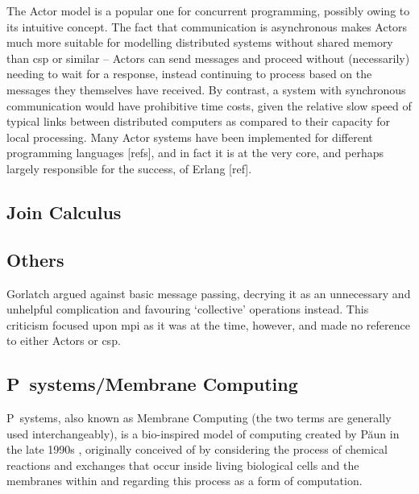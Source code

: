 The Actor model is a popular one for concurrent programming, possibly owing to its intuitive concept.  The fact that communication is asynchronous makes Actors much more suitable for modelling distributed systems without shared memory than \gls{csp} or similar -- Actors can send messages and proceed without (necessarily) needing to wait for a response, instead continuing to process based on the messages they themselves have received.  By contrast, a system with synchronous communication would have prohibitive time costs, given the relative slow speed of typical links between distributed computers as compared to their capacity for local processing.  Many Actor systems have been implemented for different programming languages [refs], and in fact it is at the very core, and perhaps largely responsible for the success, of Erlang [ref].

\subsection{Join Calculus}


\subsection{Others}

Gorlatch \cite{Gorlatch2004} argued against basic message passing, decrying it as an unnecessary and unhelpful complication and favouring `collective' operations instead.  This criticism focused upon \gls{mpi} as it was at the time, however, and made no reference to either Actors or \gls{csp}.

\subsection{P~systems/Membrane Computing}
P~systems, also known as Membrane Computing (the two terms are generally used interchangeably), is a bio-inspired model of computing created by Păun in the late 1990s \cite{tPaun98a,Paun2000}, originally conceived of by considering the process of chemical reactions and exchanges that occur inside living biological cells and the membranes within and regarding this process as a form of computation.


